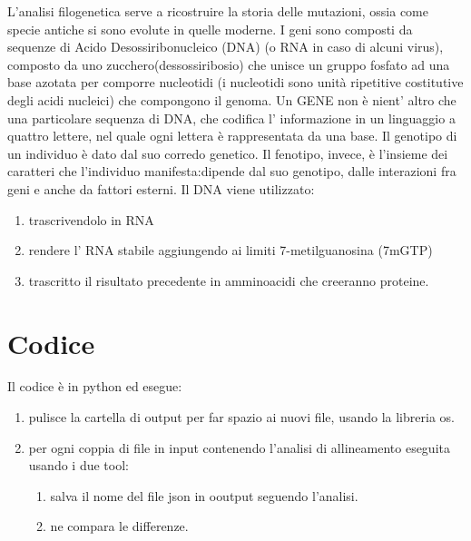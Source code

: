\documentclass[12pt]{article}
\begin{document}
	L'analisi filogenetica serve a ricostruire la storia delle mutazioni, ossia come specie antiche si sono evolute in quelle moderne.\newline
	I geni sono composti da sequenze di Acido Desossiribonucleico (DNA) (o RNA in caso di alcuni virus), composto da uno zucchero(dessossiribosio) che unisce un gruppo fosfato ad una base azotata per comporre nucleotidi (i nucleotidi sono unità ripetitive costitutive degli acidi nucleici) che compongono il genoma.\newline
	Un GENE non è nient' altro che una particolare sequenza di DNA, che codifica l' informazione in un linguaggio a quattro lettere, nel quale ogni lettera è rappresentata da una base.\newline
	Il genotipo di un individuo è dato dal suo corredo genetico.
Il fenotipo, invece, è l'insieme dei caratteri che l'individuo manifesta:dipende dal suo genotipo, dalle interazioni fra geni e anche da fattori
esterni.\newline 
\newline Il DNA viene utilizzato: \begin{enumerate} \item trascrivendolo in RNA	
\item rendere l' RNA stabile aggiungendo ai limiti 7-metilguanosina (7mGTP)
\item trascritto il risultato precedente in amminoacidi che creeranno proteine.
	 \end{enumerate}
	
\newpage
\section{Codice}
	Il codice è in python ed esegue:
	\begin{enumerate}
		\item pulisce la cartella di output per far spazio ai nuovi file, usando la libreria os.
		\item per ogni coppia di file in input contenendo l'analisi di allineamento eseguita usando i due tool:
		\begin{enumerate}
			\item salva il nome del file json in ooutput seguendo l'analisi.
			\item ne compara le differenze.
		\end{enumerate}
	\end{enumerate}
\end{document}
